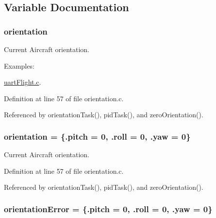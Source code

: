\subsection{Variable Documentation}
\hypertarget{group__orientation_gacd4a2942520b68691db5aebde4e537a4}{
\subsubsection[{orientation}]{ orientation}}\label{group__orientation_gacd4a2942520b68691db5aebde4e537a4}


Current Aircraft orientation. 

\begin{Desc}
\item[Examples\-: ]\par
\hyperlink{uart_flight_8c-example}{uart\-Flight.\-c}.\end{Desc}


Definition at line 57 of file orientation.\-c.



Referenced by orientation\-Task(), pid\-Task(), and zero\-Orientation().

\hypertarget{group__orientation_gacd4a2942520b68691db5aebde4e537a4}{
\subsubsection[{orientation}]{ orientation = \{.pitch = 0, .roll = 0, .yaw = 0\}}}\label{group__orientation_gacd4a2942520b68691db5aebde4e537a4}


Current Aircraft orientation. 



Definition at line 57 of file orientation.\-c.



Referenced by orientation\-Task(), pid\-Task(), and zero\-Orientation().

\hypertarget{group__orientation_gab42c272957b0a5cdc11845ade183c2f9}{
\subsubsection[{orientation\-Error}]{ orientation\-Error = \{.pitch = 0, .roll = 0, .yaw = 0\}}}\label{group__orientation_gab42c272957b0a5cdc11845ade183c2f9}


